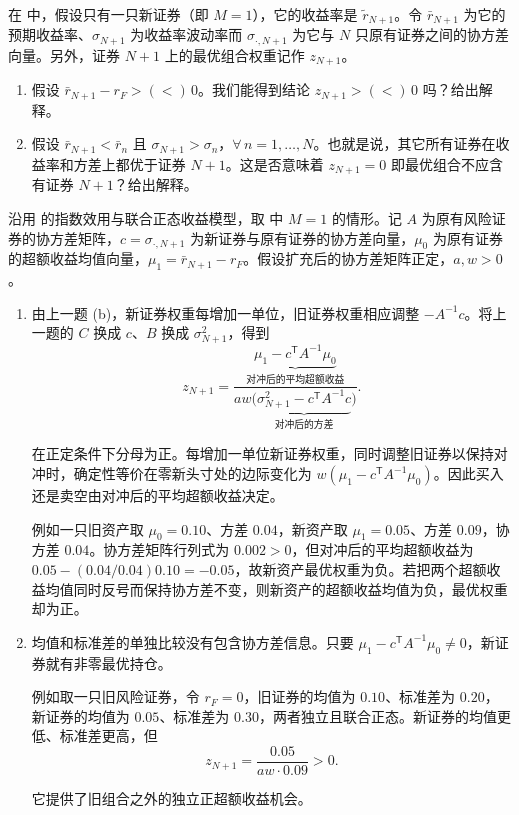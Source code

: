 \begin{problem}
 在 中，假设只有一只新证券（即 $M=1$），它的收益率是 $\tilde{r}_{N+1}$。令 $\bar{r}_{N+1}$ 为它的预期收益率、$\sigma_{N+1}$ 为收益率波动率而 $\sigma_{\cdot,N+1}$ 为它与 $N$ 只原有证券之间的协方差向量。另外，证券 $N+1$ 上的最优组合权重记作 $z_{N+1}$。
\begin{enumerate}[label=(\alph*)]
    \item 假设 $\bar{r}_{N+1}-r_{F}>(<)\,0$。我们能得到结论 $z_{N+1}>(<)\,0$ 吗？给出解释。
    \item 假设 $\bar{r}_{N+1}<\bar{r}_{n}$ 且 $\sigma_{N+1}>\sigma_{n}$，$\forall\,n=1,\ldots,N$。也就是说，其它所有证券在收益率和方差上都优于证券 $N+1$。这是否意味着 $z_{N+1}=0$ 即最优组合不应含有证券 $N+1$？给出解释。
\end{enumerate}
\end{problem}
\begin{solution}[blank-type=manual,blank-vsep=9\baselineskip]
沿用 的指数效用与联合正态收益模型，取 中 $M=1$ 的情形。记 $A$ 为原有风险证券的协方差矩阵，$c=\sigma_{\cdot,N+1}$ 为新证券与原有证券的协方差向量，$\mu_0$ 为原有证券的超额收益均值向量，$\mu_1=\bar r_{N+1}-r_F$。假设扩充后的协方差矩阵正定，$a,w>0$。

\begin{enumerate}[label=(\alph*)]
 \item 由上一题 (b)，新证券权重每增加一单位，旧证券权重相应调整 $-A^{-1}c$。将上一题的 $C$ 换成 $c$、$B$ 换成 $\sigma_{N+1}^2$，得到
 \[
 z_{N+1}=
 \frac{\underbrace{\mu_1-c^{\mathsf T}A^{-1}\mu_0}_{\text{对冲后的平均超额收益}}}
 {aw\bigl(\underbrace{\sigma_{N+1}^2-c^{\mathsf T}A^{-1}c}_{\text{对冲后的方差}}\bigr)}.
 \]

 在正定条件下分母为正。每增加一单位新证券权重，同时调整旧证券以保持对冲时，确定性等价在零新头寸处的边际变化为 $w(\mu_1-c^{\mathsf T}A^{-1}\mu_0)$。因此买入还是卖空由对冲后的平均超额收益决定。

 例如一只旧资产取 $\mu_0=0.10$、方差 $0.04$，新资产取 $\mu_1=0.05$、方差 $0.09$，协方差 $0.04$。协方差矩阵行列式为 $0.002>0$，但对冲后的平均超额收益为 $0.05-(0.04/0.04)0.10=-0.05$，故新资产最优权重为负。若把两个超额收益均值同时反号而保持协方差不变，则新资产的超额收益均值为负，最优权重却为正。

 \item 均值和标准差的单独比较没有包含协方差信息。只要
 $\mu_1-c^{\mathsf T}A^{-1}\mu_0\ne0$，新证券就有非零最优持仓。

 例如取一只旧风险证券，令 $r_F=0$，旧证券的均值为 $0.10$、标准差为 $0.20$，新证券的均值为 $0.05$、标准差为 $0.30$，两者独立且联合正态。新证券的均值更低、标准差更高，但
 \[
 z_{N+1}=\frac{0.05}{aw\cdot0.09}>0.
 \]

 它提供了旧组合之外的独立正超额收益机会。
\end{enumerate}
\end{solution}

